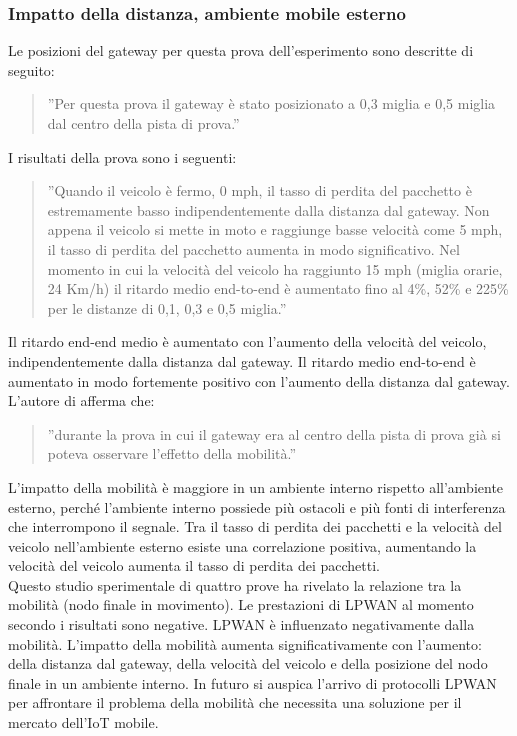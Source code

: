 \documentclass[a4paper]{report} %
\begin{document}
\subsubsection{Impatto della distanza, ambiente mobile esterno}
Le posizioni del gateway per questa prova dell'esperimento \cite{art:rif.47} sono descritte di seguito:
\begin{quote}
	''Per questa prova il gateway è stato posizionato a 0,3 miglia e 0,5 miglia dal centro della pista di prova.''
\end{quote}
I risultati della prova sono i seguenti:
\begin{quote}
	''Quando il veicolo è fermo, 0 mph, il tasso di perdita del pacchetto è estremamente basso indipendentemente dalla distanza dal gateway. Non appena il veicolo si mette in moto e raggiunge basse velocità come 5 mph, il tasso di perdita del pacchetto aumenta in modo significativo.
	Nel momento in cui la velocità del veicolo ha raggiunto 15 mph (miglia orarie, 24 Km/h) il ritardo medio end-to-end è aumentato fino al 4\%, 52\% e 225\% per le distanze di 0,1, 0,3 e 0,5 miglia.''
\end{quote}
Il ritardo end-end medio è aumentato con l'aumento della velocità del veicolo, indipendentemente dalla distanza dal gateway. Il ritardo medio end-to-end è aumentato in modo fortemente positivo con l'aumento della distanza dal gateway. 
L'autore di \cite{art:rif.47} afferma che:
\begin{quote}
	''durante la prova in cui il gateway era al centro della pista di prova già si poteva osservare l'effetto della mobilità.''
\end{quote}
L'impatto della mobilità è maggiore in un ambiente interno rispetto all'ambiente esterno, perché l'ambiente interno possiede più ostacoli e più fonti di interferenza che interrompono il segnale. 
Tra il tasso di perdita dei pacchetti e la velocità del veicolo nell'ambiente esterno esiste una correlazione positiva, aumentando la velocità del veicolo aumenta il tasso di perdita dei pacchetti. 
\\
Questo studio sperimentale di quattro prove ha rivelato la relazione tra la mobilità (nodo finale in movimento). Le prestazioni di LPWAN al momento secondo i risultati sono negative. LPWAN è influenzato negativamente dalla mobilità. L'impatto della mobilità aumenta significativamente con l'aumento: della distanza dal gateway, della velocità del veicolo e della posizione del nodo finale in un ambiente interno. In futuro si auspica l'arrivo di protocolli LPWAN per affrontare il problema della mobilità che necessita una soluzione per il mercato dell'IoT mobile.
\end{document}
